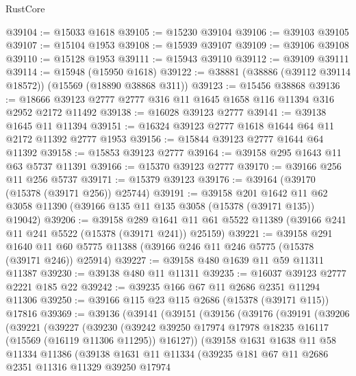 \begin{lexlean}{RustCore}
\begin{coremodule}
@39104 := @15033 @1618
@39105 := @15230 @39104
@39106 := @39103 @39105
@39107 := @15104 @1953
@39108 := @15939 @39107
@39109 := @39106 @39108
@39110 := @15128 @1953
@39111 := @15943 @39110
@39112 := @39109 @39111
@39114 := @15948 (@15950 @1618)
@39122 := @38881 (@38886 (@39112 @39114 @18572)) (@15569 (@18890 @38868 @311))
@39123 := @15456 @38868
@39136 := @18666 @39123 @2777 @2777 @316 @11 @1645 @1658 @116 @11394 @316 @2952 @2172 @11492
@39138 := @16028 @39123 @2777
@39141 := @39138 @1645 @11 @11394
@39151 := @16324 @39123 @2777 @1618 @1644 @64 @11 @2172 @11392 @2777 @1953
@39156 := @15844 @39123 @2777 @1644 @64 @11392
@39158 := @15853 @39123 @2777
@39164 := @39158 @295 @1643 @11 @63 @5737 @11391
@39166 := @15370 @39123 @2777
@39170 := @39166 @256 @11 @256 @5737
@39171 := @15379 @39123
@39176 := @39164 (@39170 (@15378 (@39171 @256)) @25744)
@39191 := @39158
    @201
    @1642
    @11
    @62
    @3058
    @11390
    (@39166 @135 @11 @135 @3058 (@15378 (@39171 @135)) @19042)
@39206 := @39158
    @289
    @1641
    @11
    @61
    @5522
    @11389
    (@39166 @241 @11 @241 @5522 (@15378 (@39171 @241)) @25159)
@39221 := @39158
    @291
    @1640
    @11
    @60
    @5775
    @11388
    (@39166 @246 @11 @246 @5775 (@15378 (@39171 @246)) @25914)
@39227 := @39158 @480 @1639 @11 @59 @11311 @11387
@39230 := @39138 @480 @11 @11311
@39235 := @16037 @39123 @2777 @2221 @185 @22
@39242 := @39235 @166 @67 @11 @2686 @2351 @11294 @11306
@39250 := @39166 @115 @23 @115 @2686 (@15378 (@39171 @115)) @17816
@39369 := @39136
    (@39141
      (@39151
        (@39156
          (@39176
            (@39191
              (@39206
                (@39221
                  (@39227
                    (@39230
                      (@39242
                        @39250
                        @17974
                        @17978
                        @18235
                        @16117
                        (@15569 (@16119 @11306 @11295))
                        @16127))
                    (@39158
                      @1631
                      @1638
                      @11
                      @58
                      @11334
                      @11386
                      (@39138
                        @1631
                        @11
                        @11334
                        (@39235
                          @181
                          @67
                          @11
                          @2686
                          @2351
                          @11316
                          @11329
                          @39250
                          @17974

\end{coremodule}
\end{lexlean}
